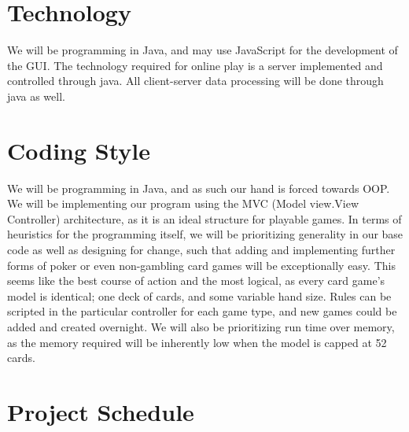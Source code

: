 \documentclass{article}
\begin{document}
\section{Technology}

We will be programming in Java, and may use JavaScript for the development of the GUI. The technology required for online play is a server implemented and controlled through java. All client-server data processing will be done through java as well.


\section{Coding Style}

We will be programming in Java, and as such our hand is forced towards OOP. We will be implementing our program using the MVC (Model view.View Controller) architecture, as it is an ideal structure for playable games. In terms of heuristics for the programming itself, we will be prioritizing generality in our base code as well as designing for change, such that adding and implementing further forms of poker or even non-gambling card games will be exceptionally easy. This seems like the best course of action and the most logical, as every card game's model is identical; one deck of cards, and some variable hand size. Rules can be scripted in the particular controller for each game type, and new games could be added and created overnight. We will also be prioritizing run time over memory, as the memory required will be inherently low when the model is capped at 52 cards.

\section{Project Schedule}


\end{document}
